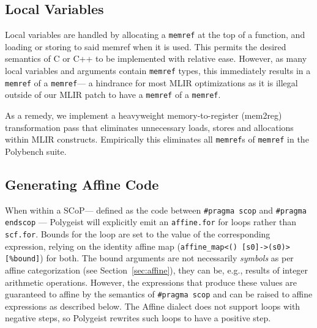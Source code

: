 \documentclass[sigplan]{acmart}
\newcommand{\icode}[1]{{\texttt {#1}}}
\newcommand{\tool}{Polygeist\xspace}
\newcommand{\memref}{\icode{memref}\xspace}
\newcommand{\scop}{SCoP\xspace}
\begin{document}
\subsection{Local Variables}
Local variables are handled by allocating a \memref at the top of a function, and loading or storing to said memref when it is used. This permits the desired semantics of C or C++ to be implemented with relative ease. However, as many local variables and arguments contain \memref types, this immediately results in a \memref of a \memref\xspace --- a hindrance for most MLIR optimizations as it is illegal outside of our MLIR patch to have a \memref of a \memref.

As a remedy, we implement a heavyweight memory-to-register (mem2reg) transformation pass that eliminates unnecessary loads, stores and allocations within MLIR constructs. Empirically this eliminates all {\memref}s of \memref in the Polybench suite. %

\subsection{Generating Affine Code}
When within a \scop\xspace --- defined as the code between \icode{\#pragma scop} and \icode{\#pragma endscop} --- \tool will explicitly emit an \icode{affine.for} for loops rather than \icode{scf.for}. Bounds for the loop are set to the value of the corresponding expression, relying on the identity affine map (\icode{affine\_map<() [s0]->(s0)>[\%bound]}) for both. The bound arguments are not necessarily \emph{symbols} as per affine categorization (see Section~\ref{sec:affine}), they can be, e.g., results of integer arithmetic operations. However, the expressions that produce these values are guaranteed to affine by the semantics of \icode{\#pragma scop} and can be raised to affine expressions as described below.
The Affine dialect does not support loops with negative steps, so \tool rewrites such loops to have a positive step. 
\end{document}
